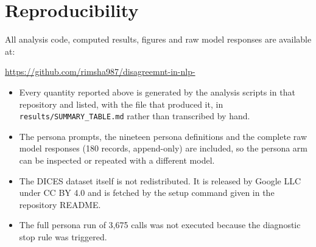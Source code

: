 \documentclass[11pt,a4paper]{article}
\begin{document}


\fi

\section*{Reproducibility}

All analysis code, computed results, figures and raw model responses are available at:
\begin{center}
\url{https://github.com/rimsha987/disagreemnt-in-nlp-}
\end{center}

\begin{itemize}[leftmargin=1.6em]
\item Every quantity reported above is generated by the analysis scripts in that repository
and listed, with the file that produced it, in \texttt{results/SUMMARY\_TABLE.md} rather than
transcribed by hand.
\item The persona prompts, the nineteen persona definitions and the complete raw model
responses (180 records, append-only) are included, so the persona arm can be inspected or
repeated with a different model.
\item The DICES dataset itself is not redistributed. It is released by Google LLC under
CC BY 4.0 and is fetched by the setup command given in the repository README.
\item The full persona run of 3,675 calls was not executed because the diagnostic stop rule
was triggered.
\end{itemize}
\end{document}
